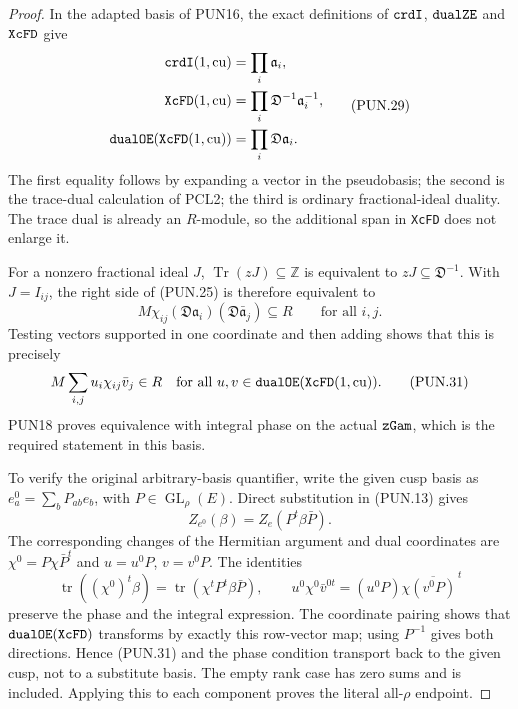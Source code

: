 \documentclass[11pt,a4paper]{article}
\numberwithin{equation}{section}
\theoremstyle{remark}\newtheorem{remark}[theorem]{Remark}
\begin{document}
\begin{proof}
In the adapted basis of PUN16, the exact definitions of
\(\texttt{crd\allowbreak I}\), \(\texttt{dual\allowbreak ZE}\) and
\(\texttt{Xc\allowbreak FD}\) give
\[
 \begin{split}
 \texttt{crd\allowbreak I}(1,\mathrm{cu})&=\prod_i\mathfrak a_i,\\
 \texttt{Xc\allowbreak FD}(1,\mathrm{cu})&=
                      \prod_i\mathfrak D^{-1}\mathfrak a_i^{-1},\\
 \texttt{dual\allowbreak OE}(\texttt{Xc\allowbreak FD}(1,\mathrm{cu}))&=
                      \prod_i\mathfrak D\mathfrak a_i.
 \end{split}                                                   \tag{PUN.29}
\]
The first equality follows by expanding a vector in the
pseudobasis; the second is the trace-dual calculation of PCL2;
the third is ordinary fractional-ideal duality.  The trace dual
is already an \(R\)-module, so the additional span in
\texttt{Xc\allowbreak FD} does not enlarge it.

For a nonzero fractional ideal \(J\),
\(\operatorname{Tr}(zJ)\subseteq\mathbb Z\) is equivalent
to \(zJ\subseteq\mathfrak D^{-1}\).  With \(J=I_{ij}\),
the right side of (PUN.25) is therefore equivalent to
\[
     M\chi_{ij}(\mathfrak D\mathfrak a_i)
                     (\mathfrak D\bar{\mathfrak a}_j)\subseteq R
                            \qquad\text{for all }i,j.
 \tag{PUN.30}
\]
Testing vectors supported in one coordinate and then adding
shows that this is precisely
\[
    M\sum_{i,j}u_i\chi_{ij}\bar v_j\in R
       \quad\text{for all }u,v\in
                     \texttt{dual\allowbreak OE}(\texttt{Xc\allowbreak FD}(1,\mathrm{cu})).
 \tag{PUN.31}
\]
PUN18 proves equivalence with integral phase on the actual
\(\texttt{z\allowbreak Gam}\), which is the required statement in this
basis.

To verify the original arbitrary-basis quantifier, write the
given cusp basis as \(e_a^0=\sum_b P_{ab}e_b\), with
\(P\in\operatorname{GL}_\rho(E)\).  Direct substitution in
(PUN.13) gives
\[
 Z_{e^0}(\beta)=Z_e(P^t\beta\bar P).
 \tag{PUN.32}
\]
The corresponding changes of the Hermitian argument and dual
coordinates are \(\chi^0=P\chi\bar P^t\) and
\(u=u^0P\), \(v=v^0P\).  The identities
\[
 \operatorname{tr}((\chi^0)^t\beta)
       =\operatorname{tr}(\chi^tP^t\beta\bar P),
 \qquad
 u^0\chi^0\bar v^{0t}=(u^0P)\chi\overline{(v^0P)}^{\,t}
 \tag{PUN.33}
\]
preserve the phase and the integral expression.  The coordinate
pairing shows that \(\texttt{dual\allowbreak OE}(\texttt{Xc\allowbreak FD})\) transforms
by exactly this row-vector map; using \(P^{-1}\) gives both
directions.  Hence (PUN.31) and the phase condition transport
back to the given cusp, not to a substitute basis.  The empty
rank case has zero sums and is included.  Applying this to
each component proves the literal all-\(\rho\) endpoint.
\end{proof}
\end{document}
